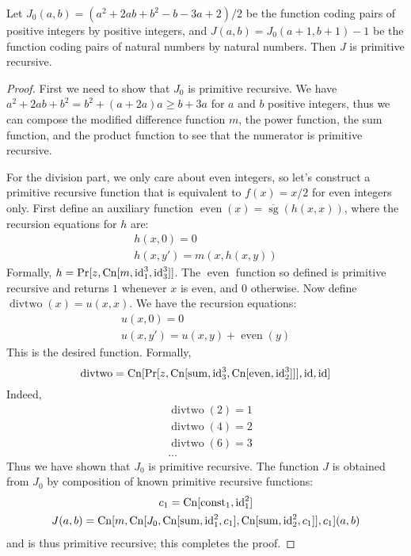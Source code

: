 \begin{exercise}[6.2]
  Let $J_0(a,b) = (a^2+2ab+b^2-b-3a+2)/2$ be the function coding pairs of positive integers by positive integers, and $J(a,b) = J_0(a+1,b+1)-1$ be the function coding pairs of natural numbers by natural numbers.
  Then $J$ is primitive recursive.
\end{exercise}
\begin{proof}
  \newcommand{\pred}{\operatorname{pred}}
  \newcommand{\sgb}{\overline{\operatorname{sg}}}
  \newcommand{\even}{\operatorname{even}}
  \newcommand{\divtwo}{\operatorname{divtwo}}
  \newcommand{\rsum}{\operatorname{sum}}
  First we need to show that $J_0$ is primitive recursive.
  We have $a^2+2ab+b^2 = b^2+(a+2a)a \ge b+3a$ for $a$ and $b$ positive integers, thus we can compose the modified difference function $m$, the power function, the sum function, and the product function to see that the numerator is primitive recursive.

  For the division part, we only care about even integers, so let's construct a primitive recursive function that is equivalent to $f(x)=x/2$ for even integers only.
  First define an auxiliary function $\even(x) = \sgb(h(x,x))$, where the recursion equations for $h$ are:
  \begin{gather*}
    h(x,0) = 0\\
    h(x,y') = m(x,h(x,y))
  \end{gather*}
  Formally, $h = \Pr[z, \operatorname{Cn}[m,\operatorname{id}^3_1,\operatorname{id}^3_3]]$.
  The $\even$ function so defined is primitive recursive and returns $1$ whenever $x$ is even, and $0$ otherwise.
  Now define $\divtwo(x)=u(x,x)$.
  We have the recursion equations:
  \begin{gather*}
    u(x,0) = 0 \\
    u(x,y') = u(x,y)+\even(y)
  \end{gather*}
  This is the desired function.
  Formally,
  \begin{equation*}
    \divtwo = \Cn[\Pr[z, \Cn[\rsum, \id^3_3, \Cn[\even, \id^3_2]]], \id, \id]
  \end{equation*}
  Indeed,
  \begin{align*}
    &\divtwo(2)=1\\
    &\divtwo(4)=2\\
    &\divtwo(6)=3\\
    &\ldots
  \end{align*}
  Thus we have shown that $J_0$ is primitive recursive.
  The function $J$ is obtained from $J_0$ by composition of known primitive recursive functions:
  \begin{gather*}
    c_1 = \Cn[\operatorname{const}_1, \id^2_1]\\
    J(a,b) = \Cn[m, \Cn[J_0, \Cn[\rsum, \id^2_1, c_1], \Cn[\rsum, \id^2_2, c_1]], c_1](a,b)
  \end{gather*}
  and is thus primitive recursive; this completes the proof.
\end{proof}

